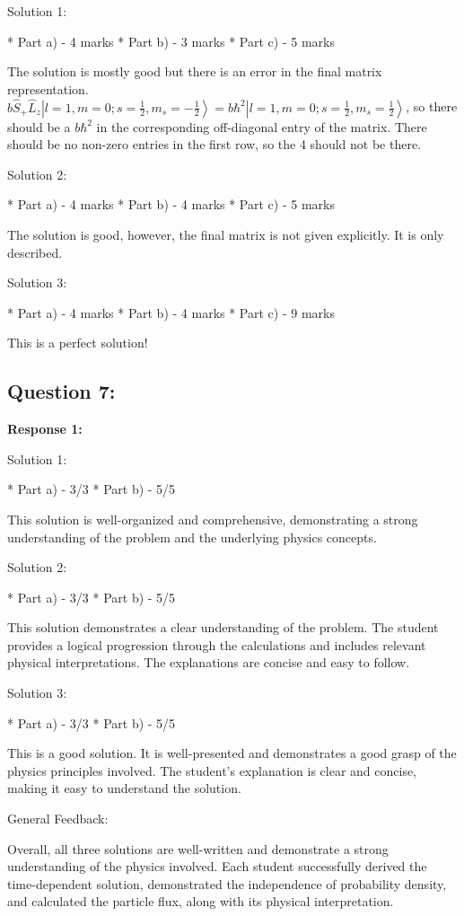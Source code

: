 \documentclass[a4paper,11pt]{article}
\begin{document}
Solution 1:

*   Part a) - 4 marks
*   Part b) - 3 marks
*   Part c) - 5 marks

The solution is mostly good but there is an error in the final matrix representation. \(b\hat{S}_{+}\hat{L}_{z} \left|l=1, m=0; s=\frac{1}{2}, m_{s} = -\frac{1}{2} \right> = b\hbar^{2} \left|l=1, m=0; s=\frac{1}{2}, m_{s} = \frac{1}{2} \right>\), so there should be a \( b\hbar^{2} \) in the corresponding off-diagonal entry of the matrix. There should be no non-zero entries in the first row, so the 4 should not be there.

Solution 2:

*   Part a) - 4 marks
*   Part b) - 4 marks
*   Part c) - 5 marks

The solution is good, however, the final matrix is not given explicitly. It is only described.

Solution 3:

*   Part a) - 4 marks
*   Part b) - 4 marks
*   Part c) - 9 marks

This is a perfect solution!

\subsection*{Question 7:}

\textbf{Response 1:}

Solution 1:

*   Part a) - 3/3
*   Part b) - 5/5

This solution is well-organized and comprehensive, demonstrating a strong understanding of the problem and the underlying physics concepts.

Solution 2:

*   Part a) - 3/3
*   Part b) - 5/5

This solution demonstrates a clear understanding of the problem. The student provides a logical progression through the calculations and includes relevant physical interpretations. The explanations are concise and easy to follow.

Solution 3:

*   Part a) - 3/3
*   Part b) - 5/5

This is a good solution. It is well-presented and demonstrates a good grasp of the physics principles involved. The student's explanation is clear and concise, making it easy to understand the solution.

General Feedback:

Overall, all three solutions are well-written and demonstrate a strong understanding of the physics involved. Each student successfully derived the time-dependent solution, demonstrated the independence of probability density, and calculated the particle flux, along with its physical interpretation. 
\end{document}
